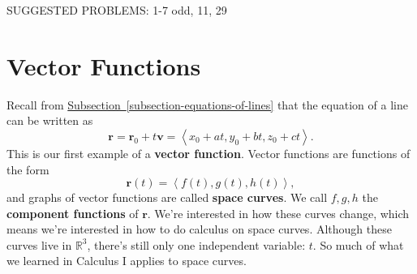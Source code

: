 \documentclass[10pt,]{book}
\newcommand{\terminology}[1]{\textbf{#1}}
\numberwithin{equation}{section}
\newcommand{\RR}{\mathbb{R}}
\newcommand{\vv}[1]{\mathbf{#1}}
\newcommand{\dotprod}[1]{\left\langle #1 \right\rangle}
\begin{document}
\hypertarget{p-1249}{}%
SUGGESTED PROBLEMS: 1-7 odd, 11, 29%
%
%
\typeout{************************************************}
\typeout{************************************************}
%
\section[{Vector Functions}]{Vector Functions}\label{section-vector-functions}
\begin{introduction}{}%
\hypertarget{p-1250}{}%
Recall from \hyperref[subsection-equations-of-lines]{Subsection~\ref{subsection-equations-of-lines}} that the equation of a line can be written as%
\begin{equation*}
\vv{r} = \vv{r}_{0}+t\vv{v} = \dotprod{x_{0}+at, y_{0}+bt, z_{0}+ct}.
\end{equation*}
This is our first example of a \terminology{vector function}. Vector functions are functions of the form%
\begin{equation*}
\vv{r}(t) = \dotprod{f(t),g(t),h(t)},
\end{equation*}
and graphs of vector functions are called \terminology{space curves}. We call \(f,g,h\) the \terminology{component functions} of \(\vv{r}\). We're interested in how these curves change, which means we're interested in how to do calculus on space curves. Although these curves live in \(\RR^{3}\), there's still only one independent variable: \(t\). So much of what we learned in Calculus I applies to space curves.%
\end{introduction}%
%
%
\typeout{************************************************}
\typeout{************************************************}
%
\end{document}
